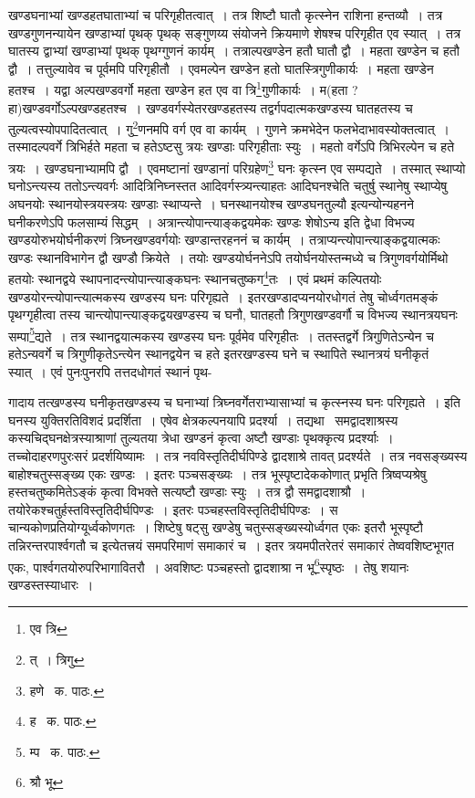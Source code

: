 \documentclass[11pt, openany]{book}
\begin{document}
\noindent खण्डघनाभ्यां खण्डहतघाताभ्यां च परिगृहीतत्वात्~। तत्र शिष्टौ घातौ कृत्स्नेन राशिना हन्तव्यौ~। तत्र खण्डगुणनन्यायेन खण्डाभ्यां पृथक् पृथक् सङ्गुणय्य संयोजने क्रियमाणे शेषश्च परिगृहीत एव स्यात्~। तत्र घातस्य द्वाभ्यां खण्डाभ्यां पृथक् पृथग्गुणनं कार्यम्~। तत्राल्पखण्डेन हतौ घातौ द्वौ~। महता खण्डेन च हतौ द्वौ~। तत्तुल्यावेव च पूर्वमपि परिगृहीतौ~। एवमल्पेन खण्डेन हतो घातस्त्रिगुणीकार्यः~। महता खण्डेन हतश्च~। यद्वा अल्पखण्डवर्गो महता खण्डेन हत एव वा त्रि\renewcommand{\thefootnote}{१}\footnote{एव त्रि}गुणीकार्यः~। म(हता ? हा)खण्डवर्गोऽल्पखण्डहतश्च~। खण्डवर्गस्येतरखण्डहतस्य तद्वर्गपदात्मकखण्डस्य घातहतस्य च तुल्यत्वस्योपपादितत्वात्~। गु\renewcommand{\thefootnote}{२}\footnote{त्~। त्रिगु}णनमपि वर्ग एव वा कार्यम्~। गुणने क्रमभेदेन फलभेदाभावस्योक्तत्वात्~। तस्मादल्पवर्गे त्रिभिर्हते महता च हतेऽष्टसु त्रयः खण्डाः परिगृहीताः स्युः~। महतो वर्गेऽपि त्रिभिरल्पेन च हते त्रयः~। खण्डघनाभ्यामपि द्वौ~। एवमष्टानां खण्डानां परिग्रहेण\renewcommand{\thefootnote}{३}\footnote{हणे \textendash\ क. पाठः.} घनः कृत्स्न एव सम्पद्यते~। तस्मात् {\qt स्थाप्यो घनोऽन्त्यस्य ततोऽन्त्यवर्गः आदित्रिनिघ्नस्तत आदिवर्गस्त्र्यन्त्याहतः आदिघनश्चे}ति चतुर्षु स्थानेषु स्थाप्येषु अघनयोः स्थानयोस्त्रयस्त्रयः खण्डाः स्थाप्यन्ते~। घनस्थानयोश्च खण्डघनतुल्यौ इत्यन्योन्यहनने घनीकरणेऽपि फलसाम्यं सिद्धम्~। अत्रान्त्योपान्त्याङ्कद्वयमेकः खण्डः शेषोऽन्य इति द्वेधा विभज्य खण्डयोरुभयोर्घनीकरणं त्रिघ्नखण्डवर्गयोः खण्डान्तरहननं च कार्यम्~। तत्राप्यन्त्योपान्त्याङ्कद्वयात्मकः खण्डः स्थानविभागेन द्वौ खण्डौ क्रियेते~। तयोः खण्डयोर्घननेऽपि तयोर्घनयोस्तन्मध्ये च त्रिगुणवर्गयोर्मिथो हतयोः स्थानद्वये स्थापनादन्त्योपान्त्याङ्कघनः स्थानचतुष्कग\renewcommand{\thefootnote}{४}\footnote{ह \textendash\ क. पाठः.}तः~। एवं प्रथमं कल्पितयोः खण्डयोरन्त्योपान्त्यात्मकस्य खण्डस्य घनः परिगृह्यते~। इतरखण्डादप्यनयोरधोगतं तेषु चोर्ध्वगतमङ्कं पृथग्गृहीत्वा तस्य चान्त्योपान्त्याङ्कद्वयखण्डस्य च घनौ, घातहतौ त्रिगुणखण्डवर्गौ च विभज्य स्थानत्रयघनः सम्पा\renewcommand{\thefootnote}{५}\footnote{म्प \textendash\ क. पाठः.}द्यते~। तत्र स्थानद्वयात्मकस्य खण्डस्य घनः पूर्वमेव परिगृहीतः~। ततस्तद्वर्गे त्रिगुणितेऽन्येन च हतेऽन्यवर्गे च त्रिगुणीकृतेऽन्त्येन स्थानद्वयेन च हते इतरखण्डस्य घने च स्थापिते स्थानत्रयं घनीकृतं स्यात्~। एवं पुनःपुनरपि तत्तदधोगतं स्थानं पृथ-

\newpage

\noindent गादाय तत्खण्डस्य घनीकृतखण्डस्य च घनाभ्यां त्रिघ्नवर्गेतराभ्यासाभ्यां च कृत्स्नस्य घनः परिगृह्यते~। इति घनस्य युक्तिरतिविशदं प्रदर्शिता~। एषेव क्षेत्रकल्पनयापि प्रदर्श्या~। तद्यथा \textendash\ समद्वादशाश्रस्य कस्यचिद्घनक्षेत्रस्याश्राणां तुल्यतया त्रेधा खण्डनं कृत्वा अष्टौ खण्डाः पृथक्कृत्य प्रदर्श्याः~। तच्चोदाहरणपुरःसरं प्रदर्शयिष्यामः~। तत्र नवविस्तृतिदीर्घपिण्डे द्वादशाश्रे तावत् प्रदर्श्यते~। तत्र नवसङ्ख्यस्य बाहोश्चतुस्सङ्ख्य एकः खण्डः~। इतरः पञ्चसङ्ख्यः~। तत्र भूस्पृष्टादेककोणात् प्रभृति
त्रिष्वप्यश्रेषु हस्तचतुष्कमितेऽङ्कं कृत्वा विभक्ते सत्यष्टौ खण्डाः स्युः~। तत्र द्वौ समद्वादशाश्रौ~। तयोरेकश्चतुर्हस्तविस्तृतिदीर्घपिण्डः~। इतरः
पञ्चहस्तविस्तृतिदीर्घपिण्डः~। स चान्यकोणप्रतियोग्यूर्ध्वकोणगतः~। शिष्टेषु षट्सु खण्डेषु चतुस्सङ्ख्यस्योर्ध्वगत एकः इतरौ भूस्पृष्टौ तन्निरन्तरपार्श्वगतौ च इत्येतत्त्रयं समपरिमाणं समाकारं च~। इतर त्रयमपीतरेतरं समाकारं तेष्ववशिष्टभूगत एकः, पार्श्वगतयोरुपरिभागावितरौ~। अवशिष्टः पञ्चहस्तो द्वादशाश्रा न भू\renewcommand{\thefootnote}{१}\footnote{श्रौ भू}स्पृष्ठः~। तेषु शयानः खण्डस्तस्याधारः~। 
\end{document}

